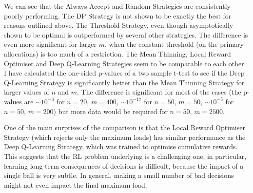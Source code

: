 We can see that the Always Accept and Random Strategies are consistently poorly performing. The DP Strategy is not shown to be exactly the best for reasons outlined above. The Threshold Strategy, even though asymptotically shown to be optimal is outperformed by several other strategies. The difference is even more significant for larger $m$, when the constant threshold (on the primary allocations) is too much of a restriction. The Mean Thinning, Local Reward Optimiser and Deep Q-Learning Strategies seem to be comparable to each other. I have calculated the one-sided p-values of a two sample t-test to see if the Deep Q-Learning Strategy is significantly better than the Mean Thinning Strategy for larger values of $n$ and $m$. The difference is significant for most of the cases (the p-values are $\sim 10^{-3}$ for $n=20$, $m=400$, $\sim 10^{-17}$ for $n=50$, $m=50$, $\sim 10^{-5}$ for $n=50$, $m=200$) but more data would be required for $n=50$, $m=2500$.  



One of the main surprises of the comparison is that the Local Reward Optimiser Strategy (which rejects only the maximum loads) has similar performance as the Deep Q-Learning Strategy, which was trained to optimise cumulative rewards. This suggests that the RL problem underlying \TwoThinning is a challenging one, in particular, learning long-term consequences of decisions is difficult, because the impact of a single ball is very subtle. In general, making a small number of bad decisions might not even impact the final maximum load. 


